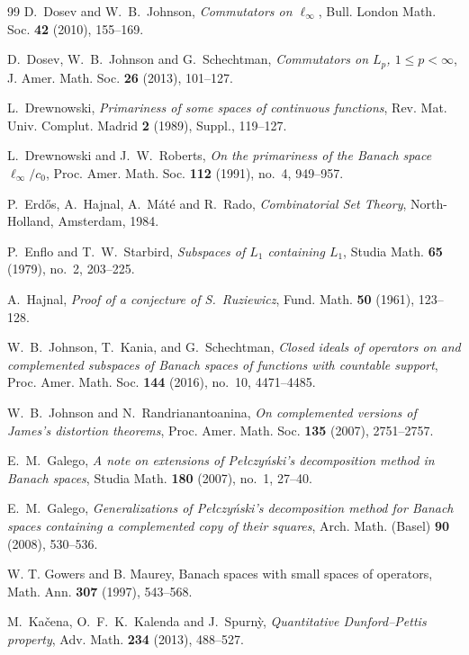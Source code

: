 \documentclass[11pt]{amsart}
\theoremstyle{plain}
\theoremstyle{definition}
\numberwithin{equation}{section}
\renewcommand{\leq}{\leqslant}
\begin{document}
\begin{thebibliography}{99}
D.~Dosev and W.~B.~Johnson,
\emph{Commutators on $\ell_\infty$},
Bull. London Math. Soc. \textbf{42} (2010), 155--169.

D.~Dosev, W.~B.~Johnson and G.~Schechtman,
\emph{Commutators on $L_p$, $1\leq p<\infty$},
J. Amer. Math. Soc. \textbf{26} (2013), 101--127.

L.~Drewnowski,
\emph{Primariness of some spaces of continuous functions},
Rev. Mat. Univ. Complut. Madrid \textbf{2} (1989), Suppl., 119--127.

L.~Drewnowski and J.~W.~Roberts,
\emph{On the primariness of the Banach space $\ell_\infty/c_0$},
Proc. Amer. Math. Soc. \textbf{112} (1991), no.~4, 949--957.

P.~Erd\H{o}s, A.~Hajnal, A.~M\'at\'e and R.~Rado,
\emph{Combinatorial Set Theory},
North-Holland, Amsterdam, 1984.

P.~Enflo and T.~W.~Starbird,
\emph{Subspaces of $L_1$ containing $L_1$},
Studia Math. \textbf{65} (1979), no.~2, 203--225.

A.~Hajnal,
\emph{Proof of a conjecture of S.~Ruziewicz},
Fund. Math. \textbf{50} (1961), 123--128.

W.~B.~Johnson, T.~Kania, and G.~Schechtman,
\emph{Closed ideals of operators on and complemented subspaces of Banach spaces of functions with countable support},
Proc. Amer. Math. Soc. \textbf{144} (2016), no.~10, 4471--4485.

W.~B.~Johnson and N.~Randrianantoanina,
\emph{On complemented versions of James's distortion theorems},
Proc. Amer. Math. Soc. \textbf{135} (2007), 2751--2757.

E.~M.~Galego,
\emph{A note on extensions of Pe{\l}czy\'nski's decomposition method in Banach spaces},
Studia Math. \textbf{180} (2007), no.~1, 27--40.

E.~M.~Galego,
\emph{Generalizations of Pe{\l}czy\'nski's decomposition method for Banach spaces containing a complemented copy of their squares},
Arch. Math. (Basel) \textbf{90} (2008), 530--536.

W. T. Gowers and B. Maurey,
Banach spaces with small spaces of operators,
Math. Ann. \textbf{307} (1997), 543--568.


M.~Ka{\v{c}}ena, O.~F.~K.~Kalenda and J.~Spurn{\`y},
\emph{Quantitative Dunford--Pettis property},
Adv. Math. \textbf{234} (2013), 488--527.


\end{thebibliography}
\end{document}
